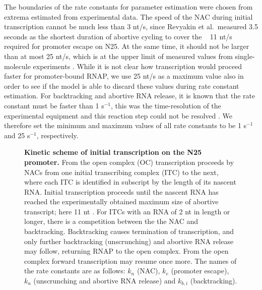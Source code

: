 The boundaries of the rate constants for parameter estimation were chosen from
extrema estimated from experimental data. The speed of the NAC during initial
transcription cannot be much less than 3 nt/s, since Revyakin et al.\ measured
3.5 seconds as the shortest duration of abortive cycling
\cite{revyakin_abortive_2006} to cover the ~ 11 nt/s required for promoter
escape on N25. At the same time, it should not be larger than at most 25 nt/s,
which is at the upper limit of measured values from single-molecule
experiments \cite{bai_mechanochemical_2007}. While it is not clear how
transcription would proceed faster for promoter-bound RNAP, we use 25 nt/s as
a maximum value also in order to see if the model is able to discard these
values during rate constant estimation. For backtracking and abortive RNA
release, it is known that the rate constant must be faster than 1 s$^{-1}$,
this was the time-resolution of the experimental equipment and this reaction
step could not be resolved \cite{revyakin_abortive_2006}. We therefore set the
minimum and maximum values of all rate constants to be 1 s$^{-1}$ and 25
s$^{-1}$, respectively. 

\begin{figure}[h]
  \caption{{\bf Kinetic scheme of initial transcription on the N25 promoter.}
    From the open complex (OC) transcription proceeds by NACs from one initial
    transcribing complex (ITC) to the next, where each ITC is identified in
    subscript by the length of its nascent RNA. Initial transcription proceeds
    until the nascent RNA has reached the experimentally obtained maximum size
    of abortive transcript; here 11 nt \cite{hsu_initial_2006}. For ITCs with
    an RNA of 2 nt in length or longer, there is a competition between the the
    NAC and backtracking. Backtracking causes termination of transcription,
    and only further backtracking (unscrunching) and abortive RNA release may
    follow, returning RNAP to the open complex. From the open complex forward
    transcription may resume once more. The names of the rate constants are as
    follows: $k_n$ (NAC), $k_e$ (promoter escape), $k_u$ (unscrunching and
    abortive RNA release) and $k_{b,i}$ (backtracking).}
    \label{fig:model_and_rates}
\end{figure}

